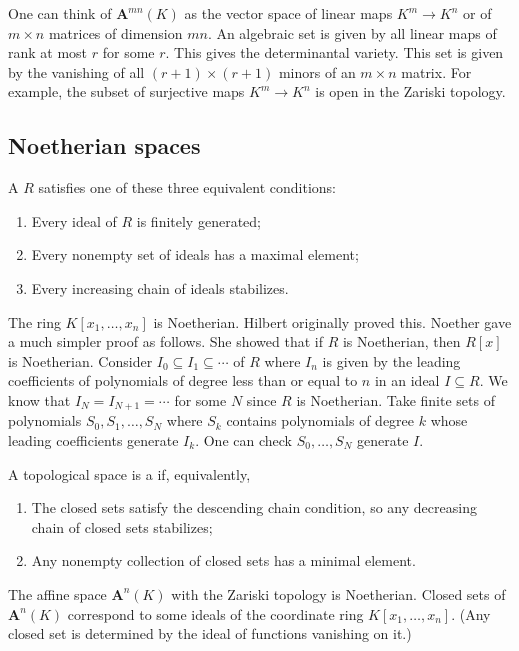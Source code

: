 \documentclass [11 pt, oneside, margin = 1 in] {article}
\begin{document}
\begin{example}\label{}\text{}
One can think of $\mathbf{A}^{mn}(K)$ as the vector space of linear maps $K^m \longrightarrow K^n$ or of $m\times n$ matrices of dimension $mn$. An algebraic set is given by all linear maps of rank at most $r$ for some $r$. This gives the determinantal variety. This set is given by the vanishing of all $(r+1)\times  (r+1)$ minors of an $m\times n $ matrix. For example, the subset of surjective maps $K^m\longrightarrow K^n$ is open in the Zariski topology.
\end{example}

\subsection{Noetherian spaces}
\begin{definition}[ ]\label{}\text{}
A  $R$ satisfies one of these three equivalent conditions:
\begin{enumerate}
	\item Every ideal of $R$ is finitely generated;
	\item Every nonempty set of ideals has a maximal element;
	\item Every increasing chain of ideals stabilizes. 
\end{enumerate}
\end{definition}

\begin{example}[ ]\label{}\text{}
The ring $K[x_1,\hdots, x_n]$ is Noetherian. Hilbert originally proved this. Noether gave a much simpler proof as follows. She showed that if $R$ is Noetherian, then $R[x]$ is Noetherian. Consider $I_0\subseteq I_1\subseteq\cdots$ of $R$ where $I_n$ is given by the leading coefficients of polynomials of degree less than or equal to $n$ in an ideal $I\subseteq R$. We know that $I_N=I_{N+1}=\cdots$ for some $N$ since $R$ is Noetherian. Take finite sets of polynomials $S_0,S_1,\hdots, S_N$ where $S_k$ contains polynomials of degree $k$ whose leading coefficients generate $I_k$. One can check $S_0,\hdots, S_N$ generate $I$. 
\end{example}

\begin{definition}[ ]\label{}\text{}
A topological space is a  if, equivalently,
\begin{enumerate}
	\item The closed sets satisfy the descending chain condition, so any decreasing chain of closed sets stabilizes;
	\item Any nonempty collection of closed sets has a minimal element.
\end{enumerate}
\end{definition}
 \begin{remark}
 	The affine space $\mathbf{A}^n(K)$ with the Zariski topology is Noetherian. Closed sets of $\mathbf{A}^n(K)$ correspond to some ideals of the coordinate ring $K[x_1,\hdots, x_n]$. (Any closed set is determined by the ideal of functions vanishing on it.)
 \end{remark}
\end{document}
